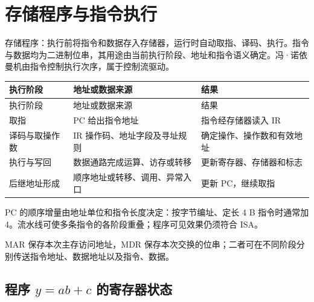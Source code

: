 \section{存储程序与指令执行}\label{CO01-execution}

存储程序：执行前将指令和数据存入存储器，运行时自动取指、译码、执行。指令与数据均为二进制位串，其用途由当前执行阶段、地址和指令语义确定。冯·诺依曼机由指令控制执行次序，属于控制流驱动。

\par\smallskip
{\fontsize{9.3}{12}\selectfont\setlength{\tabcolsep}{2.5pt}\setlength{\LTleft}{0pt}\setlength{\LTright}{0pt}
\begin{longtable}{@{}>{\raggedright\arraybackslash}p{}>{\raggedright\arraybackslash}p{}>{\raggedright\arraybackslash}p{}@{}}
\toprule
执行阶段 & 地址或数据来源 & 结果 \\

\midrule\endfirsthead\toprule
执行阶段 & 地址或数据来源 & 结果 \\

\midrule\endhead\bottomrule\endfoot
取指 & PC 给出指令地址 & 指令经存储器读入 IR \\

译码与取操作数 & IR 操作码、地址字段及寻址规则 & 确定操作、操作数和有效地址 \\

执行与写回 & 数据通路完成运算、访存或转移 & 更新寄存器、存储器和标志 \\

后继地址形成 & 顺序地址或转移、调用、异常入口 & 更新 PC，继续取指 \\

\end{longtable}}
\par\smallskip

PC 的顺序增量由地址单位和指令长度决定：按字节编址、定长 4 B 指令时通常加 4。流水线可使多条指令的各阶段重叠；程序可见效果仍须符合 ISA。

MAR 保存本次主存访问地址，MDR 保存本次交换的位串；二者可在不同阶段分别传送指令地址、数据地址以及指令、数据。

\subsection{\texorpdfstring{程序 \(y=ab+c\) 的寄存器状态}{程序 y=ab+c 的寄存器状态}}\label{CO01-program}

